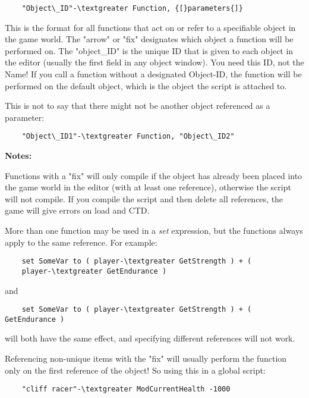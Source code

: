\begin{lstlisting}
	"Object\_ID"-\textgreater Function, {[}parameters{]}
\end{lstlisting}

This is the format for all functions that act on or refer to a
specifiable object in the game world. The "arrow" or "fix" designates
which object a function will be performed on. The "object\_ID" is the
unique ID that is given to each object in the editor (usually the first
field in any object window). You need this ID, not the Name! If you call
a function without a designated Object-ID, the function will be
performed on the default object, which is the object the script is
attached to.

This is not to say that there might not be another object referenced as
a parameter:

\begin{lstlisting}
	"Object\_ID1"-\textgreater Function, "Object\_ID2"
\end{lstlisting}

\textbf{Notes:}

Functions with a "fix" will only compile if the object has already been
placed into the game world in the editor (with at least one reference),
otherwise the script will not compile. If you compile the script and
then delete all references, the game will give errors on load and CTD.

More than one function may be used in a \emph{set} expression, but the
functions always apply to the same reference. For example:

\begin{lstlisting}
	set SomeVar to ( player-\textgreater GetStrength ) + (
	player-\textgreater GetEndurance )
\end{lstlisting}

and

\begin{lstlisting}
	set SomeVar to ( player-\textgreater GetStrength ) + ( GetEndurance )
\end{lstlisting}

will both have the same effect, and specifying different references will
not work.

Referencing non-unique items with the "fix" will usually perform the
function only on the first reference of the object! So using this in a
global script:

\begin{lstlisting}
	"cliff racer"-\textgreater ModCurrentHealth -1000
\end{lstlisting}

